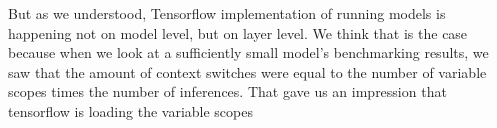 But as we understood, Tensorflow implementation of running models is happening not on model level, but on layer level. We think that is the case because when we look at a sufficiently small model's benchmarking results, we saw that the amount of context switches were equal to the number of variable scopes times the number of inferences. That gave us an impression that tensorflow is loading the variable scopes 